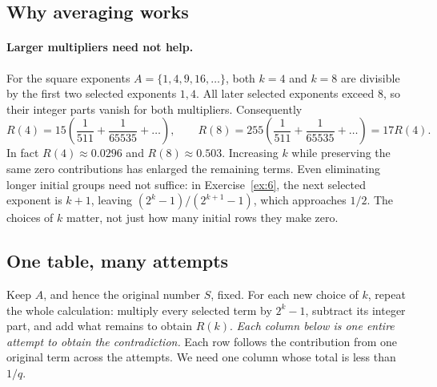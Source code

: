 \documentclass[10pt]{article}
\theoremstyle{plain}
\theoremstyle{definition}
\theoremstyle{remark}
\begin{document}
\begin{samepage}
\section{Why averaging works}\label{sec:general}

\paragraph{Larger multipliers need not help.}
For the square exponents $A=\{1,4,9,16,\dots\}$, both $k=4$ and $k=8$
are divisible by the first two selected exponents $1,4$. All later selected
exponents exceed $8$, so their integer parts vanish for both multipliers.
Consequently
\[
 R(4)=15\left(\frac1{511}+\frac1{65535}+\dots\right),\qquad
 R(8)=255\left(\frac1{511}+\frac1{65535}+\dots\right)=17R(4).
\]
In fact $R(4)\approx0.0296$ and $R(8)\approx0.503$. Increasing $k$ while
preserving the same zero contributions has enlarged the remaining terms.
Even eliminating longer initial groups need not suffice: in
Exercise~\ref{ex:6}, the next selected exponent is $k+1$, leaving
$(2^k-1)/(2^{k+1}-1)$, which approaches $1/2$. The choices of $k$ matter,
not just how many initial rows they make zero.\par
\end{samepage}

\subsection{One table, many attempts}

Keep $A$, and hence the original number $S$, fixed. For each new choice of
$k$, repeat the whole calculation: multiply every selected term by $2^k-1$,
subtract its integer part, and add what remains to obtain $R(k)$.
\emph{Each column below is one entire attempt to obtain the contradiction.}
Each row follows the contribution from one original term across the attempts.
We need one column whose total is less than $1/q$.
\end{document}
